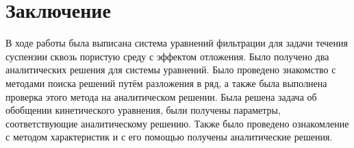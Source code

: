 \section{Заключение}
\par В ходе работы была выписана система уравнений фильтрации для задачи течения суспензии сквозь пористую среду с эффектом отложения. Было получено два аналитических решения для системы уравнений. Было проведено знакомство с методами поиска решений путём разложения в ряд, а также была выполнена проверка этого метода на аналитическом решении. Была решена задача об обобщении кинетического уравнения, были получены параметры, соответствующие аналитическому решению. Также было проведено ознакомление с методом характеристик и с его помощью получены аналитические решения.
